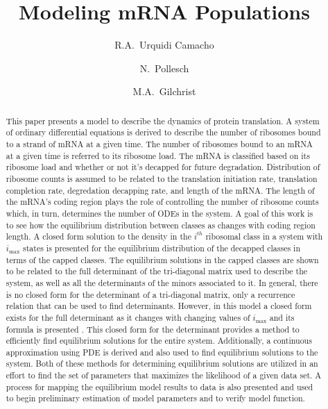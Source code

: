 \documentclass[review]{elsarticle}
\newcommand{\imax}{\ensuremath{{i_{\max}}}\xspace}
\begin{document}
\title{Modeling mRNA Populations}
\author[utkgst]{R.A.~Urquidi Camacho}
\author[utkm,curradd]{N.~Pollesch}
\author[utkgst,utkeeb,nimbios,cor1]{M.A.~Gilchrist}
\address[utkgst]{Genome Science and Technology Program, University of Tennessee, Knoxville, TN 37996-XXX}
\address[utkm]{Department of Mathematics, University of Tennessee,  Knoxville, TN 37996-1320}
\address[utkeeb]{Department of Ecology and Evolutionary Biology, University of Tennessee, Knoxville, TN 37996-1610}
\address[nimbios]{National Institute for Mathematical and Biological Synthesis, University of Tennessee, Knoxville, TN 37996-3410}

\begin{abstract}
This paper presents a model to describe the dynamics of protein translation.  
A system of ordinary differential equations is derived to describe the number of ribosomes bound to a strand of mRNA at a given time.
The number of ribosomes bound to an mRNA at a given time is referred to its ribosome load.
The mRNA is classified based on its ribosome load and whether or not it's decapped for future degradation.  
Distribution of ribosome counts is assumed to be related to the translation initiation rate, translation completion rate, degredation decapping rate, and length of the mRNA.
The length of the mRNA's coding region plays the role of controlling the number of ribosome counts which, in turn, determines the number of ODEs in the system.  
A goal of this work is to see how the equilibrium distribution between classes as changes with coding region length.
A closed form solution to the density in the $i^{th}$ ribosomal class in a system with \imax states is presented for the equilibrium distribution of the decapped classes in terms of the capped classes.
The equilibrium solutions in the capped classes are shown to be related to the full determinant of the tri-diagonal matrix used to describe the system, as well as all the determinants of the minors associated to it.
In general, there is no closed form for the determinant of a tri-diagonal matrix, only a recurrence relation that can be used to find determinants.
However, in this model a closed form exists for the full determinant as it changes with changing values of \imax and its formula is presented .
This closed form for the determinant provides a method to efficiently find equilibrium solutions for the entire system.
Additionally, a continuous approximation using PDE is derived and also used to find equilibrium solutions to the system.
Both of these methods for determining equilibrium solutions are utilized in an effort to find the set of parameters that maximizes the likelihood of a given data set.
A process for mapping the equilibrium model results to data is also presented and used to begin preliminary estimation of model parameters and to verify model function.
 

\end{abstract}
\end{document}

